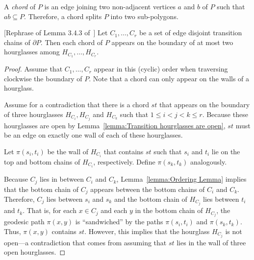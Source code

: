 \documentclass[a4paper,UKenglish]{lipics}
\newcommand{\p}[2]{\ensuremath{\pi(#1, #2)}}
\begin{document}
A \emph{chord} of $P$ is an edge joining two non-adjacent vertices $a$ and $b$ of $P$ such that $ab\subseteq P$. Therefore, a chord splits $P$ into two sub-polygons.

\begin{lemma}\label{lemma:Edges appear a constant number of times}
[Rephrase of Lemma 3.4.3 of~\cite{aronov1993furthest}]
Let $C_1, \ldots, C_r$ be a set of edge disjoint transition chains of $\partial P$. Then each chord of $P$ appears on the boundary of  at most two hourglasses among $H_{C_1}, \ldots, H_{C_r}$.
\end{lemma}
\begin{proof}
Assume that $C_1, \ldots, C_r$ appear in this (cyclic) order when traversing clockwise the boundary of $P$.
Note that a chord can only appear on the walls of a hourglass. 

Assume for a contradiction that there is a chord $st$ that appears on the boundary of three hourglasses $H_{C_i}, H_{C_j}$ and $H_{C_k}$ such that $1\leq i < j < k\leq r$. 
Because these hourglasses are open by Lemma~\ref{lemma:Transition hourglasses are open}, $st$ must be an edge on exactly one wall of each of these hourglasses. 

Let $\p{s_i}{t_i}$ be the wall of $H_{C_i}$ that contains $st$ such that $s_i$ and $t_i$ lie on the top and bottom chains of $H_{C_i}$, respectively. Define $\p{s_k}{t_k}$ analogously.

Because  $C_j$ lies in between $C_i$ and $C_k$, Lemma~\ref{lemma:Ordering Lemma} implies that the bottom chain of $C_j$ appears between the bottom chains of $C_i$ and $C_k$. Therefore, $C_j$ lies between $s_i$ and $s_k$ and the bottom chain of $H_{C_j}$ lies between $t_i$ and $t_k$. 
That is, for each $x\in C_j$ and each $y$ in the bottom chain of $H_{C_j}$, the geodesic path $\p{x}{y}$ is ``sandwiched'' by the paths $\p{s_i}{t_i}$ and $\p{s_k}{t_k}$.
Thus, $\p{x}{y}$ contains $st$.
However, this implies that the hourglass $H_{C_j}$ is not open---a contradiction that comes from assuming that $st$ lies in the  wall of three open hourglasses.
\end{proof}

\end{document}
